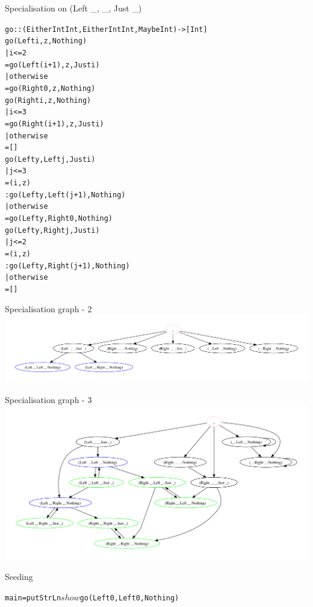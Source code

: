 \documentclass[t]{beamer}
\newcommand{\oomph}[1]{\textcolor[rgb]{0.0,0.5,0.9}{#1}}
\newcommand{\disab}[1]{\textcolor[rgb]{0.7,0.7,0.7}{#1}}
\begin{document}
\begin{frame}[fragile]{Specialisation on (Left \_, \_, Just \_)}
\begin{alltt}\tiny
go :: (Either Int Int, Either Int Int, Maybe Int) -> [Int]
\disab{go (Left i, z, Nothing)
 | i <= 2
 = go (Left (i+1), z, Just i)
 | otherwise
 = go (Right 0,    z, Nothing)
go (Right i, z, Nothing)
 | i <= 3
 = go (Right (i+1), z, Just i)
 | otherwise
 = []}
go (\oomph{Left y}, Left  j, Just i)
 | j <= 3
 = (i, z)
 : \oomph{go (Left y, Left (j+1), Nothing)}
 | otherwise
 = \oomph{go (Left y, Right 0,    Nothing)}
go (\oomph{Left y}, Right j, Just i)
 | j <= 2
 = (i, z)
 : \oomph{go (Left y, Right (j+1), Nothing)}
 | otherwise
 = []
\end{alltt}
\end{frame}

\begin{frame}{Specialisation graph - 2}
\includegraphics[scale=0.30, trim=10mm 0mm 0mm 10mm, clip]{seeding-2.pdf}
\end{frame}

\begin{frame}{Specialisation graph - 3}
\includegraphics[scale=0.33, trim=10mm 0mm 0mm 10mm, clip]{seeding-3.pdf}
\end{frame}

\begin{frame}[fragile]{Seeding}
\begin{alltt}
main = putStrLn $ show $ go (Left 0, Left 0, Nothing)
\end{alltt}
\end{frame}
\end{document}
